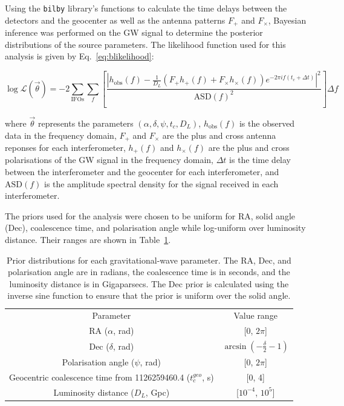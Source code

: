 \documentclass[11pt,a4paper]{article}
\begin{document}
Using the \texttt{bilby} library's functions to calculate the time delays between the detectors and the geocenter as well as the antenna patterns $F_\mathrm{+}$ and $F_\times$, Bayesian inference was performed on the GW signal to determine the posterior distributions of the source parameters. The likelihood function used for this analysis is given by Eq.~\ref{eq:blikelihood}:

\begin{equation}
    \log \mathcal{L}(\vec{\theta}) = 
    -2 \sum_{\text{IFOs}} \sum_{f}
    \left[
    \frac{\left| h_{\text{obs}}(f) - \frac{1}{D_L} \left( {F_+} h_+(f) + {F_\times} h_\times(f) \right) e^{-2\pi i f (t_c + \Delta t)} \right|^2}{\text{ASD}(f)^2}
    \right] \Delta f
    \label{eq:blikelihood}
\end{equation}    

where $\vec{\theta}$ represents the parameters $(\alpha, \delta, \psi, t_c, D_L)$, $h_{\text{obs}}(f)$ is the observed data in the frequency domain, $F_+$ and $F_\times$ are the plus and cross antenna reponses for each interferometer, $h_+(f)$ and $h_\times(f)$ are the plus and cross polarisations of the GW signal in the frequency domain, $\Delta t$ is the time delay between the interferometer and the geocenter for each interferometer, and $\text{ASD}(f)$ is the amplitude spectral density for the signal received in each interferometer. 

The priors used for the analysis were chosen to be uniform for RA, solid angle (Dec), coalescence time, and polarisation angle while log-uniform over luminosity distance. Their ranges are shown in Table~\ref{tab:priors}.

\begin{table}[h]
    \centering
    \begin{tabular}{cc}
    Parameter & Value range \\
    RA ($\alpha$, rad) & [0, $2\pi$] \\
    Dec ($\delta$, rad) & $\arcsin(-\frac{\delta}{2}-1)$ \\
    Polarisation angle ($\psi$, rad) & [0, $2\pi$] \\
    Geocentric coalescence time from 1126259460.4 ($t_c^{geo}$, s) & [0, 4] \\
    Luminosity distance ($D_L$, Gpc) & [$10^{-4}$, $10^5$] \\
    \end{tabular}
    \caption{Prior distributions for each gravitational-wave parameter. The RA, Dec, and polarisation angle are in radians, the coalescence time is in seconds, and the luminosity distance is in Gigaparsecs. The Dec prior is calculated using the inverse sine function to ensure that the prior is uniform over the solid angle.}
    \label{tab:priors}
\end{table}
\end{document}

